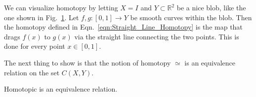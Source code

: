 \documentclass[crop=false,class=book,oneside]{standalone}                      %
\begin{document}
            We can visualize homotopy by letting $X=I$ and
            $Y\subset\mathbb{R}^{2}$ be a nice blob, like the one shown in
            Fig.~\ref{fig:straight_line_homotopy}. Let
            $f,g:[0,1]\rightarrow Y$ be smooth curves within the blob. Then
            the homotopy defined in Eqn.~\ref{eqn:Straight_Line_Homotopy} is
            the map that drags $f(x)$ to $g(x)$ via the straight line connecting
            the two points. This is done for every point $x\in [0,1]$.
            \begin{figure}[H]
                \centering
                \captionsetup{type=figure}
                
                \label{fig:straight_line_homotopy}
            \end{figure}
            The next thing to show is that the notion of homotopy $\simeq$
            is an equivalence relation on the set $C(X,Y)$.
            \begin{theorem}
                Homotopic is an equivalence relation.
            \end{theorem}
\end{document}
